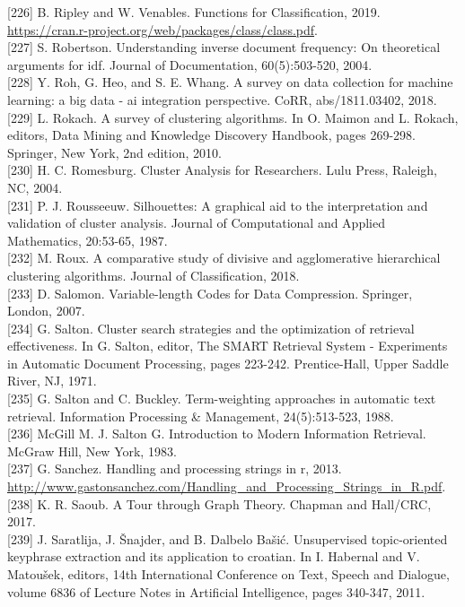 \documentclass[10pt]{book}
\begin{document}
[226] B. Ripley and W. Venables. Functions for Classification, 2019. \href{https://cran.r-project.org/web/packages/class/class.pdf}{https://cran.r-project.org/web/packages/class/class.pdf}.\\[0pt]
[227] S. Robertson. Understanding inverse document frequency: On theoretical arguments for idf. Journal of Documentation, 60(5):503-520, 2004.\\[0pt]
[228] Y. Roh, G. Heo, and S. E. Whang. A survey on data collection for machine learning: a big data - ai integration perspective. CoRR, abs/1811.03402, 2018.\\[0pt]
[229] L. Rokach. A survey of clustering algorithms. In O. Maimon and L. Rokach, editors, Data Mining and Knowledge Discovery Handbook, pages 269-298. Springer, New York, 2nd edition, 2010.\\[0pt]
[230] H. C. Romesburg. Cluster Analysis for Researchers. Lulu Press, Raleigh, NC, 2004.\\[0pt]
[231] P. J. Rousseeuw. Silhouettes: A graphical aid to the interpretation and validation of cluster analysis. Journal of Computational and Applied Mathematics, 20:53-65, 1987.\\[0pt]
[232] M. Roux. A comparative study of divisive and agglomerative hierarchical clustering algorithms. Journal of Classification, 2018.\\[0pt]
[233] D. Salomon. Variable-length Codes for Data Compression. Springer, London, 2007.\\[0pt]
[234] G. Salton. Cluster search strategies and the optimization of retrieval effectiveness. In G. Salton, editor, The SMART Retrieval System - Experiments in Automatic Document Processing, pages 223-242. Prentice-Hall, Upper Saddle River, NJ, 1971.\\[0pt]
[235] G. Salton and C. Buckley. Term-weighting approaches in automatic text retrieval. Information Processing \& Management, 24(5):513-523, 1988.\\[0pt]
[236] McGill M. J. Salton G. Introduction to Modern Information Retrieval. McGraw Hill, New York, 1983.\\[0pt]
[237] G. Sanchez. Handling and processing strings in r, 2013. \href{http://www.gastonsanchez.com/Handling_and_Processing_Strings_in_R.pdf}{http://www.gastonsanchez.com/Handling\_and\_Processing\_Strings\_in\_R.pdf}.\\[0pt]
[238] K. R. Saoub. A Tour through Graph Theory. Chapman and Hall/CRC, 2017.\\[0pt]
[239] J. Saratlija, J. Šnajder, and B. Dalbelo Bašić. Unsupervised topic-oriented keyphrase extraction and its application to croatian. In I. Habernal and V. Matoušek, editors, 14th International Conference on Text, Speech and Dialogue, volume 6836 of Lecture Notes in Artificial Intelligence, pages 340-347, 2011.\\[0pt]
\end{document}

